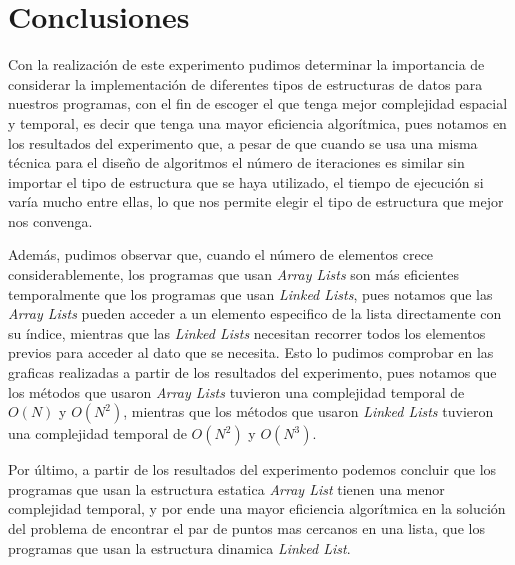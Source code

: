 \section{Conclusiones}
Con la realización de este experimento pudimos determinar la importancia de considerar la implementación de diferentes tipos de estructuras de datos para nuestros programas, con el fin de escoger el que tenga mejor complejidad espacial y temporal, es decir que tenga una mayor eficiencia algorítmica, pues notamos en los resultados del experimento que, a pesar de que cuando se usa una misma técnica para el diseño de algoritmos el número  de iteraciones es similar sin importar el tipo de estructura que se haya utilizado, el tiempo de ejecución si varía mucho entre ellas, lo que nos permite elegir el tipo de estructura que mejor nos convenga.

Además, pudimos observar que, cuando el número de elementos crece considerablemente, los programas que usan \textit{Array Lists} son más eficientes temporalmente que los programas que usan \textit{Linked Lists}, pues notamos que las \textit{Array Lists} pueden acceder a un elemento especifico de la lista directamente con su índice, mientras que las \textit{Linked Lists} necesitan recorrer todos los elementos previos para acceder al dato que se necesita. Esto lo pudimos comprobar en las graficas realizadas a partir de los resultados del experimento, pues notamos que los métodos que usaron \textit{Array Lists} tuvieron una complejidad temporal de $O(N)$ y $O(N^2)$, mientras que los métodos que usaron \textit{Linked Lists} tuvieron una complejidad temporal de $O(N^2)$ y $O(N^3)$.

Por último, a partir de los resultados del experimento podemos concluir que los programas que usan la estructura estatica \textit{Array List} tienen una menor complejidad temporal, y por ende una mayor eficiencia algorítmica en la solución del problema de encontrar el par de puntos mas cercanos en una lista, que los programas que usan la estructura dinamica \textit{Linked List}.
